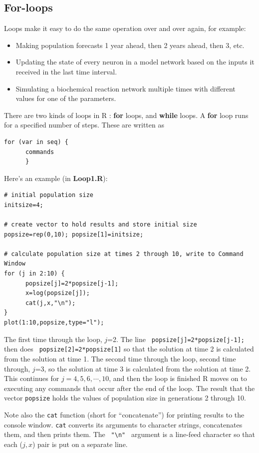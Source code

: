 \documentclass [11pt]{article}
\def\n{\mathbf{n}}
\newcommand{\blst}{\vspace{-0.035in} \begin{lstlisting}}
\numberwithin{exercise}{section}
\def\R{R }
\begin{document}
\subsection{For-loops}
Loops make it easy to do the same operation over and over again, for 
example: 
\begin{itemize}
\item Making population forecasts 1 year ahead, then 2 years ahead, then 3, etc.
\item Updating the state of every neuron in a model network based on the inputs it 
received in the last time interval. 
\item Simulating a biochemical reaction network multiple times with different values
for one of the parameters.
\end{itemize} 

There are two kinds of loops in \R: \textbf{for} loops, and 
\textbf{while} loops. A \textbf{for} loop runs for a specified number of 
steps. These are written as 
\blst
for (var in seq) {
      commands
      }
\end{lstlisting}
Here's an example (in \textbf{Loop1.R}): 
\blst
# initial population size
initsize=4; 

# create vector to hold results and store initial size 
popsize=rep(0,10); popsize[1]=initsize;

# calculate population size at times 2 through 10, write to Command Window
for (j in 2:10) { 
      popsize[j]=2*popsize[j-1];
      x=log(popsize[j]);
      cat(j,x,"\n");
}
plot(1:10,popsize,type="l"); 
\end{lstlisting}

The first time through the loop, $j$=2. The line \verb! popsize[j]=2*popsize[j-1];! 
then does \verb! popsize[2]=2*popsize[1]! so that the solution at time 2 is calculated
from the solution at time 1. The second time through the loop, 
second time through, $j$=3, so the solution at time 3 is calculated from the
solution at time 2. This continues for $j=4,5,6,\cdots,10$, and then the loop is
finished \R moves on to executing any 
commands that occur after the end of the loop. The result that the vector \texttt{popsize} holds
the values of population size in generations 2 through 10. 

Note also the \texttt{cat} function (short for ``concatenate'')
for printing results to the console window. \texttt{cat} converts 
its arguments to character strings, concatenates them, and then prints them. 
The \verb! "\n" ! argument is a line-feed character
so that each ($j,x$) pair is put on a separate line. 
\end{document}
